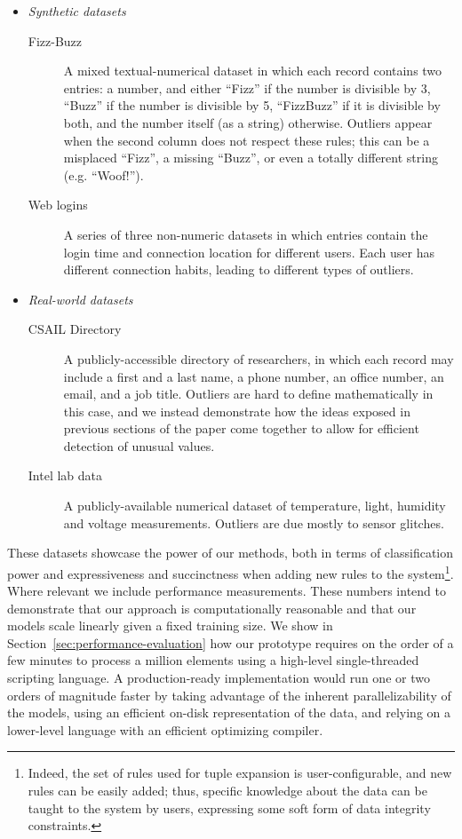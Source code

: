 \begin{itemize}
\item \emph{Synthetic datasets}
  \begin{description}
  \item[Fizz-Buzz] A mixed textual-numerical dataset in which each record contains two entries: a number, and either ``Fizz'' if the number is divisible by 3, ``Buzz'' if the number is divisible by 5, ``FizzBuzz'' if it is divisible by both, and the number itself (as a string) otherwise. Outliers appear when the second column does not respect these rules; this can be a misplaced ``Fizz'', a missing ``Buzz'', or even a totally different string (e.g. ``Woof!'').
  \item[Web logins] A series of three non-numeric datasets in which entries contain the login time and connection location for different users. Each user has different connection habits, leading to different types of outliers.
  \end{description}
\item \emph{Real-world datasets}
  \begin{description}
  \item[CSAIL Directory] A publicly-accessible directory of researchers, in which each record may include a first and a last name, a phone number, an office number, an email, and a job title. Outliers are hard to define mathematically in this case, and we instead demonstrate how the ideas exposed in previous sections of the paper come together to allow for efficient detection of unusual values.
  \item[Intel lab data] A publicly-available numerical dataset of temperature, light, humidity and voltage measurements. Outliers are due mostly to sensor glitches.
  \end{description}
\end{itemize}

These datasets showcase the power of our methods, both in terms of classification power and expressiveness and succinctness when adding new rules to the system\footnote{Indeed, the set of rules used for tuple expansion is user-configurable, and new rules can be easily added; thus, specific knowledge about the data can be taught to the system by users, expressing some soft form of data integrity constraints.}. Where relevant we include performance measurements. These numbers intend to demonstrate that our approach is computationally reasonable and that our models scale linearly given a fixed training size. We show in Section~\ref{sec:performance-evaluation} how our prototype requires on the order of a few minutes to process a million elements using a high-level single-threaded scripting language. A production-ready implementation would run one or two orders of magnitude faster by taking advantage of the inherent parallelizability of the models, using an efficient on-disk representation of the data, and relying on a lower-level language with an efficient optimizing compiler.

